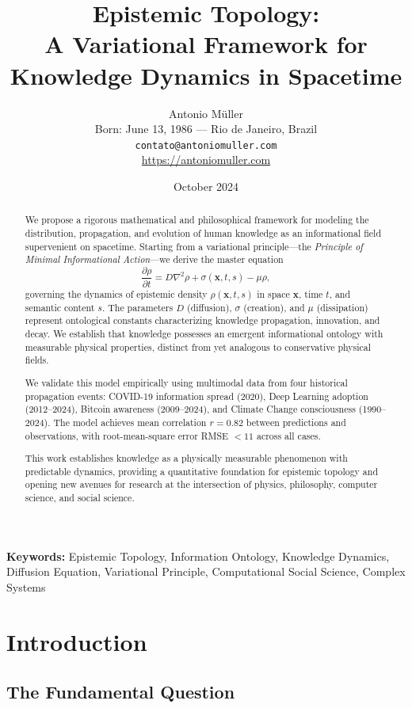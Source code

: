 \documentclass[12pt]{article}
\title{\textbf{Epistemic Topology:}\\
A Variational Framework for Knowledge Dynamics in Spacetime}
\author{
Antonio Müller\\
\small Born: June 13, 1986 --- Rio de Janeiro, Brazil\\
\small \texttt{contato@antoniomuller.com}\\
\small \url{https://antoniomuller.com}
}
\date{\small October 2024}
\begin{document}
\maketitle

\begin{abstract}
We propose a rigorous mathematical and philosophical framework for modeling the distribution, propagation, and evolution of human knowledge as an informational field supervenient on spacetime. Starting from a variational principle---the \emph{Principle of Minimal Informational Action}---we derive the master equation
\[
\frac{\partial \rho}{\partial t} = D \nabla^2 \rho + \sigma(\mathbf{x},t,s) - \mu \rho,
\]
governing the dynamics of epistemic density $\rho(\mathbf{x},t,s)$ in space $\mathbf{x}$, time $t$, and semantic content $s$. 
The parameters $D$ (diffusion), $\sigma$ (creation), and $\mu$ (dissipation) represent ontological constants characterizing knowledge propagation, innovation, and decay. We establish that knowledge possesses an emergent informational ontology with measurable physical properties, distinct from yet analogous to conservative physical fields.

We validate this model empirically using multimodal data from four historical propagation events: COVID-19 information spread (2020), Deep Learning adoption (2012--2024), Bitcoin awareness (2009--2024), and Climate Change consciousness (1990--2024). The model achieves mean correlation $r = 0.82$ between predictions and observations, with root-mean-square error RMSE $< 11$ across all cases.

This work establishes knowledge as a physically measurable phenomenon with predictable dynamics, providing a quantitative foundation for epistemic topology and opening new avenues for research at the intersection of physics, philosophy, computer science, and social science.
\end{abstract}

\noindent\textbf{Keywords:} Epistemic Topology, Information Ontology, Knowledge Dynamics, Diffusion Equation, Variational Principle, Computational Social Science, Complex Systems

\section{Introduction}

\subsection{The Fundamental Question}
\end{document}
